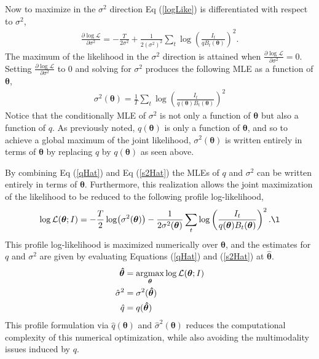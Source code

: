 \documentclass[12pt]{article}
\newcommand{\argmax}{\operatornamewithlimits{argmax}}
\begin{document}
%
Now to maximize in the $\sigma^2$ direction Eq (\ref{logLike}) is 
differentiated with respect to $\sigma^2$,
%
\begin{align}
\frac{\partial \log\mathcal{L}}{\partial \sigma^2} = -\frac{T}{2\sigma^2} + \frac{1}{2(\sigma^2)^2}\sum_t \log\left(\frac{I_t}{qB_t(\bm{\theta})}\right)^2.
\end{align}
%
The maximum of the likelihood in the $\sigma^2$ direction is attained when 
$\frac{\partial \log\mathcal{L}}{\partial \sigma^2}=0$. Setting 
$\frac{\partial \log\mathcal{L}}{\partial \sigma^2}$ to 0 and solving for
$\sigma^2$ produces the following MLE as a function of $\bm{\theta}$,
%
\begin{align}
\sigma^2(\bm{\theta}) = \frac{1}{T}\sum_t \log\left(\frac{I_t}{q(\bm{\theta})B_t(\bm{\theta})}\right)^2 \label{s2Hat}
\end{align}
%
Notice that the conditionally MLE of $\sigma^2$ is not only a function of 
$\bm{\theta}$ but also a function of $q$. As previously noted, $q(\bm{\theta})$ 
is only a function of $\bm{\theta}$, and so to achieve a global maximum of the 
joint likelihood, $\sigma^2(\bm \theta)$ is written entirely in terms of 
$\bm \theta$ by replacing $q$ by $q(\bm{\theta})$ as seen above.

%
By combining Eq (\ref{qHat}) and Eq (\ref{s2Hat}) the MLEs of $q$ and $\sigma^2$ 
can be written entirely in terms of $\bm{\theta}$. Furthermore, this 
realization allows the joint maximization of the likelihood to be reduced to the 
following profile log-likelihood,
\begin{align}
\log\mathcal{L}(\bm{\theta}; I) = - \frac{T}{2}\log( \sigma^2(\bm{\theta})) - \frac{1}{2 \sigma^2(\bm{\theta})}\sum_t \log\left(\frac{I_t}{q(\bm{\theta})B_t(\bm{\theta})}\right)^2. \l
\end{align}
%
This profile log-likelihood is maximized numerically over $\bm{\theta}$, and the 
estimates for $q$ and $\sigma^2$ are given by evaluating Equations (\ref{qHat}) 
and (\ref{s2Hat}) at $\bm{\hat\theta}$. 
\begin{align}
\bm{\hat \theta} &= \argmax_{\bm{\theta}} \log\mathcal{L}(\bm{\theta}; I)\\
\hat \sigma^2 &= \sigma^2(\bm{\hat\theta})\\
\hat q &= q(\bm{\hat\theta})
\end{align}
%
This profile formulation via $\hat q(\bm{\theta})$ and 
$\hat \sigma^2(\bm{\theta})$ reduces the computational complexity of this
numerical optimization, while also avoiding the multimodality issues induced 
by $q$. 
\end{document}
